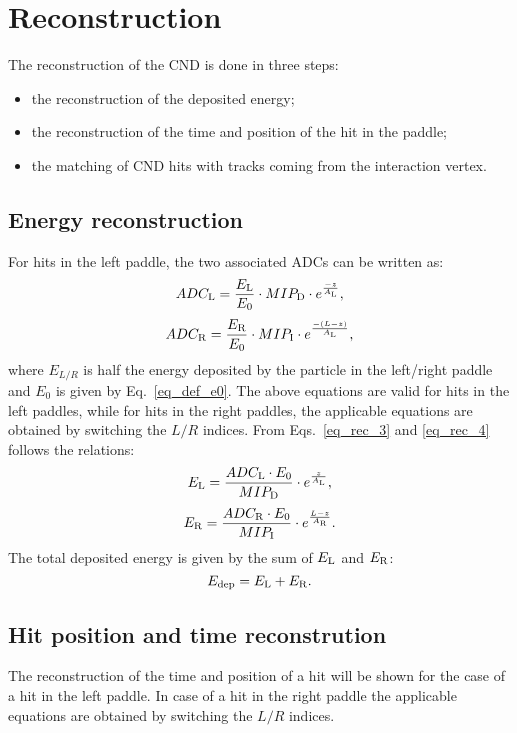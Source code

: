 \section{Reconstruction}\label{sec_rec}
The reconstruction of the CND is done in three steps:
\begin{itemize}
\item{the reconstruction of the deposited energy;}
\item{the reconstruction of the time and position of the hit in the paddle;}
\item{the matching of CND hits with tracks coming from the interaction vertex.}
\end{itemize}

\subsection{Energy reconstruction}
For hits in the left paddle, the two associated ADCs can be written as:
\begin{equation}
\label{eq_rec_3}
ADC_{\rm{L}}=\frac{E_{\rm{L}}}{E_0}\cdot MIP_{\rm{D}}\cdot e^{\frac{-z}{A_{\rm{L}}}},
\end{equation}
\begin{equation}
\label{eq_rec_4}
ADC_{\rm{R}}=\frac{E_{\rm{R}}}{E_0}\cdot MIP_{\rm{I}}\cdot e^{\frac{-(L-z)}{A_{\rm{L}}}},
\end{equation}
where $E_{L/R}$ is half the energy deposited by the particle in the left/right paddle and $E_0$ is given by Eq.~\ref{eq_def_e0}.
The above equations are valid for hits in the left paddles, while for hits in the right paddles, the applicable equations are obtained by switching the $L/R$ indices.
From Eqs.~\ref{eq_rec_3} and \ref{eq_rec_4} follows the relations:
\begin{equation}
E_{\rm{L}}=\frac{ADC_{\rm{L}} \cdot E_0}{MIP_{\rm{D}}}\cdot e^{\frac{z}{A_{\rm{L}}}},
\end{equation}
\begin{equation}
E_{\rm{R}}=\frac{ADC_{\rm{R}} \cdot E_0}{MIP_{\rm{I}}}\cdot e^{\frac{L-z}{A_{\rm{R}}}}.
\end{equation}
The total deposited energy is given by the sum of $E_{\rm{L}}$ and $E_{\rm{R}}$:
\begin{equation}
E_{\rm{dep}}=E_{\rm{L}}+E_{\rm{R}}.
\end{equation}

\subsection{Hit position and time reconstrution}
The reconstruction of the time and position of a hit will be shown for the case of a hit in the left paddle. In case of a hit in the right paddle the applicable equations are obtained by switching the $L/R$ indices.

